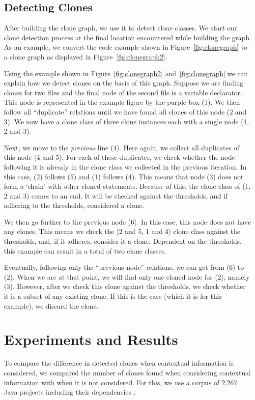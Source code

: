 \documentclass[journal]{IEEEtran}
\begin{document}
\subsection{Detecting Clones} \label{sec:detectingclones}
After building the clone graph, we use it to detect clone classes. We start our clone detection process at the final location encountered while building the graph. As an example, we convert the code example shown in Figure~\ref{fig:clonegraph} to a clone graph as displayed in Figure~\ref{fig:clonegraph2}.

Using the example shown in Figure~\ref{fig:clonegraph2} and~\ref{fig:clonegraph} we can explain how we detect clones on the basis of this graph. Suppose we are finding clones for two files and the final node of the second file is a variable declarator. This node is represented in the example figure by the purple box (1). We then follow all ``duplicate'' relations until we have found all clones of this node (2 and 3). We now have a clone class of three clone instances each with a single node (1, 2 and 3).

Next, we move to the \textit{previous} line (4). Here again, we collect all duplicates of this node (4 and 5). For each of these duplicates, we check whether the node following it is already in the clone class we collected in the previous iteration. In this case, (2) follows (5) and (1) follows (4). This means that node (3) does not form a `chain' with other cloned statements. Because of this, the clone class of (1, 2 and 3) comes to an end. It will be checked against the thresholds, and if adhering to the thresholds, considered a clone.

We then go further to the previous node (6). In this case, this node does not have any clones. This means we check the (2 and 5, 1 and 4) clone class against the thresholds, and, if it adheres, consider it a clone. Dependent on the thresholds, this example can result in a total of two clone classes.

Eventually, following only the ``previous node'' relations, we can get from (6) to (2). When we are at that point, we will find only one cloned node for (2), namely (3). However, after we check this clone against the thresholds, we check whether it is a subset of any existing clone. If this is the case (which it is for this example), we discard the clone.

\section{Experiments and Results}
To compare the difference in detected clones when contextual information is considered, we compared the number of clones found when considering contextual information with when it is not considered. For this, we use a corpus of 2,267 Java projects including their dependencies \cite{baars2019towards}.
\end{document}
